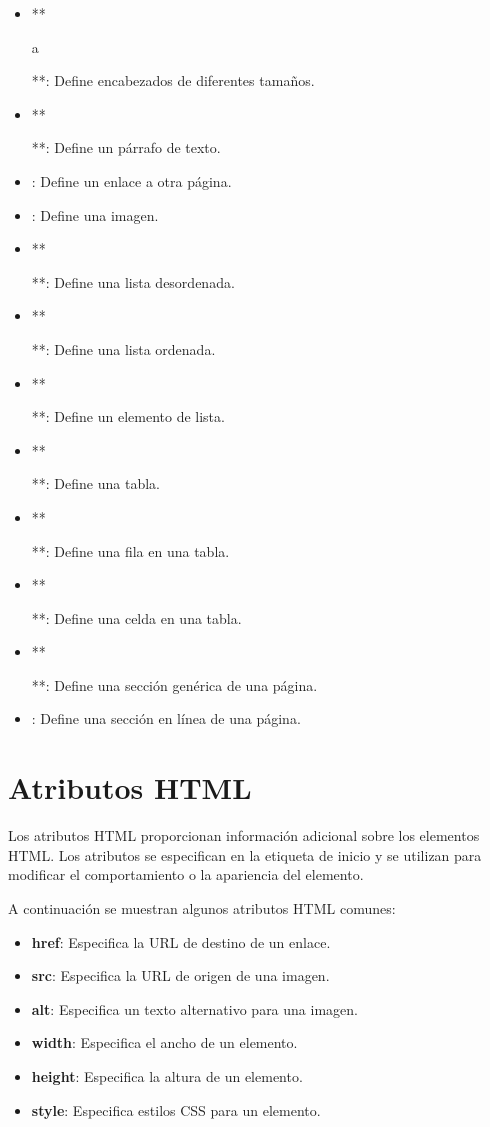 \documentclass[
  a4paper,
  DIV=11,
  numbers=noendperiod,
  onepage,
  openany]{scrreprt}
\providecommand{\tightlist}{%
  \setlength{\itemsep}{0pt}\setlength{\parskip}{0pt}}\usepackage{longtable,booktabs,array}
\begin{document}
\begin{itemize}
\tightlist
\item
  **

  a

  **: Define encabezados de diferentes tamaños.
\item
  **

  **: Define un párrafo de texto.
\item
  \textbf{}: Define un enlace a otra página.
\item
  \textbf{}: Define una imagen.
\item
  **

  **: Define una lista desordenada.
\item
  **

  **: Define una lista ordenada.
\item
  **

  **: Define un elemento de lista.
\item
  **

  **: Define una tabla.
\item
  **

  **: Define una fila en una tabla.
\item
  **

  **: Define una celda en una tabla.
\item
  **

  **: Define una sección genérica de una página.
\item
  \textbf{}: Define una sección en línea de una página.
\end{itemize}

\section{Atributos HTML}\label{atributos-html}

Los atributos HTML proporcionan información adicional sobre los
elementos HTML. Los atributos se especifican en la etiqueta de inicio y
se utilizan para modificar el comportamiento o la apariencia del
elemento.

A continuación se muestran algunos atributos HTML comunes:

\begin{itemize}
\tightlist
\item
  \textbf{href}: Especifica la URL de destino de un enlace.
\item
  \textbf{src}: Especifica la URL de origen de una imagen.
\item
  \textbf{alt}: Especifica un texto alternativo para una imagen.
\item
  \textbf{width}: Especifica el ancho de un elemento.
\item
  \textbf{height}: Especifica la altura de un elemento.
\item
  \textbf{style}: Especifica estilos CSS para un elemento.
\end{itemize}
\end{document}
